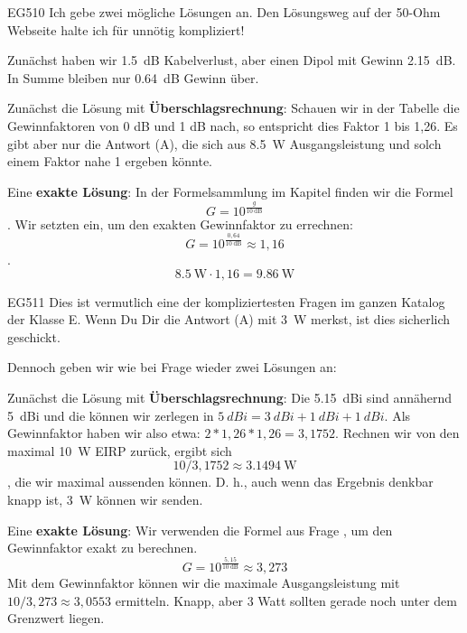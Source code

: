 \begin{sol}{EG510}
    Ich gebe zwei mögliche Lösungen an. Den Lösungsweg auf der 50-Ohm Webseite halte ich für unnötig kompliziert!

    Zunächst haben wir \SI{1,5}{\dB} Kabelverlust, aber einen Dipol mit Gewinn \SI{2,15}{\dB}. In Summe bleiben nur \SI{0,64}{\dB} Gewinn über.

    Zunächst die Lösung mit \textbf{Überschlagsrechnung}:
    Schauen wir in der Tabelle die Gewinnfaktoren von 0 dB und 1 dB nach, so entspricht dies Faktor 1 bis 1,26. Es gibt aber nur die Antwort (A), die sich aus \SI{8,5}{\watt} Ausgangsleistung und solch einem Faktor nahe 1 ergeben könnte.

    Eine \textbf{exakte Lösung}:    
    In der Formelsammlung im Kapitel  finden wir die Formel $$ G = 10^\frac{g}{\SI{10}{\dB}}$$. Wir setzten ein, um den exakten Gewinnfaktor zu errechnen:
    $$G = 10^\frac{0,64}{\SI{10}{\dB}} \approx 1,16 $$.
    $$\SI{8,5}{\watt} \cdot 1,16 = \SI{9,86}{\watt}$$

\end{sol}

\begin{sol}{EG511}
    Dies ist vermutlich eine der kompliziertesten Fragen im ganzen Katalog der Klasse E. Wenn Du Dir die Antwort (A) mit \SI{3}{\watt} merkst, ist dies sicherlich geschickt.

    Dennoch geben wir wie bei Frage  wieder zwei Lösungen an:

    Zunächst die Lösung mit \textbf{Überschlagsrechnung}:
    Die \SI{5,15}{dBi} sind annähernd \SI{5}{dBi} und die können wir zerlegen in $\SI{5}{dBi} = \SI{3}{dBi} + \SI{1}{dBi} + \SI{1}{dBi}$. Als Gewinnfaktor haben wir also etwa: $2*1,26*1,26=3,1752$. 
    Rechnen wir von den maximal \SI{10}{\watt} EIRP zurück, ergibt sich $$10/3,1752 \approx \SI{3,1494}{\watt}$$, die wir maximal aussenden können.
    D. h., auch wenn das Ergebnis denkbar knapp ist, \SI{3}{\watt} können wir senden.
    
    Eine \textbf{exakte Lösung}:   
    Wir verwenden die Formel aus Frage , um den Gewinnfaktor exakt zu berechnen.
    $$G = 10^\frac{5,15}{\SI{10}{\dB}} \approx 3,273 $$
    Mit dem Gewinnfaktor können wir die maximale Ausgangsleistung mit $10 / 3,273 \approx 3,0553$ ermitteln.
    Knapp, aber 3 Watt sollten gerade noch unter dem Grenzwert liegen.
\end{sol}


\begin{ohmchapter}
 
\end{ohmchapter}


